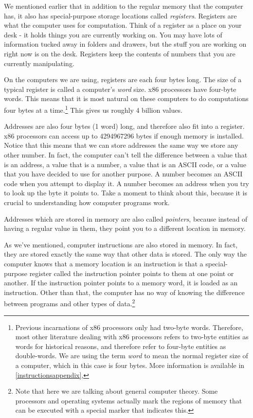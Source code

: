 We mentioned earlier that in addition to the regular memory that the 
computer has, it also has
special-purpose storage locations called \emph{registers}.
Registers are what the computer uses for computation.  
Think of a register as a place on your desk - it holds things you are currently
working on.  You may have lots of information tucked away in folders and
drawers, but the stuff you are working on right now is on the desk.  
Registers keep the contents of numbers that you are currently manipulating.

On the computers
we are using, registers are each four bytes long.  The size of a typical
register is called a computer's \emph{word} size.  x86 processors have four-byte words.  This means that it is most natural on
these computers to do computations four bytes at a time.\footnote{Previous incarnations of x86 processors only had two-byte words.  Therefore,
most other literature dealing with x86 processors refers to two-byte entities
as words for historical reasons, and therefore refer to four-byte entities as 
double-words.  We are using the term \emph{word} to mean the 
normal register size of a computer, which in this case is four bytes.  More
information is available in \autoref{instructionsappendix},
}
  This gives us
roughly 4 billion values.

Addresses are also four bytes (1 word) long, and therefore also fit into a 
register.  x86 processors can access
up to 4294967296 bytes if enough memory is installed.  Notice that this
means that we can store addresses the same way we store any other number.
In fact, the computer can't tell the difference between a value that is
an address, a value that is a number, a value that is an ASCII code, or
a value that you have decided to use for another purpose.  A number becomes
an ASCII code when you attempt to display it.  A number becomes an address
when you try to look up the byte it points to.  Take a moment to think about
this, because it is crucial to understanding how computer programs work.

Addresses which are stored in memory are also called 
\emph{pointers}, because instead of having a regular
value in them, they point you to a different location in memory.

As we've mentioned, computer instructions are also stored in memory.  
In fact, they are stored
exactly the same way that other data is stored.  The only way the computer
knows that a memory location is an instruction is that a special-purpose register called the instruction pointer points to them at one point or another.  If the instruction pointer points
to a memory word, it is loaded as an instruction.  Other than that, the 
computer has no way of knowing the difference between programs and other types
of data.\footnote{Note that here we are talking about general computer
theory.  Some processors and operating systems actually mark the regions
of memory that can be executed with a special marker that indicates this.
}

